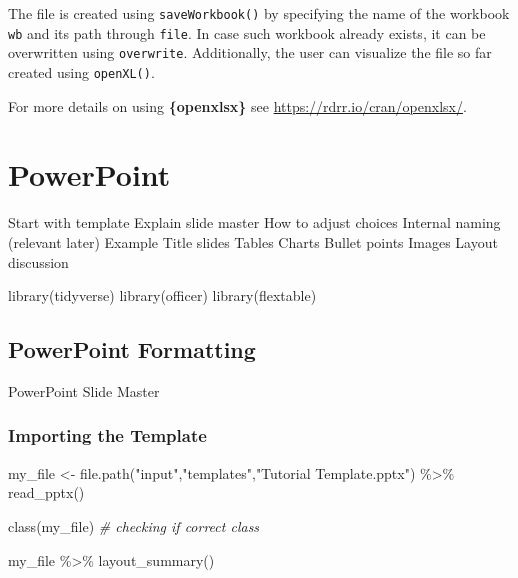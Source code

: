 \documentclass[
]{book}
\newenvironment{Shaded}{\begin{snugshade}}{\end{snugshade}}
\newcommand{\CommentTok}[1]{\textcolor[rgb]{0.56,0.35,0.01}{\textit{#1}}}
\newcommand{\FunctionTok}[1]{\textcolor[rgb]{0.00,0.00,0.00}{#1}}
\newcommand{\NormalTok}[1]{#1}
\newcommand{\OtherTok}[1]{\textcolor[rgb]{0.56,0.35,0.01}{#1}}
\newcommand{\SpecialCharTok}[1]{\textcolor[rgb]{0.00,0.00,0.00}{#1}}
\newcommand{\StringTok}[1]{\textcolor[rgb]{0.31,0.60,0.02}{#1}}
\begin{document}
The file is created using \texttt{saveWorkbook()} by specifying the name of the workbook \texttt{wb} and its path through \texttt{file}. In case such workbook already exists, it can be overwritten using \texttt{overwrite}. Additionally, the user can visualize the file so far created using \texttt{openXL()}.

For more details on using \textbf{\{openxlsx\}} see \url{https://rdrr.io/cran/openxlsx/}.

\hypertarget{powerpoint}{%
\section{PowerPoint}\label{powerpoint}}

Start with template
Explain slide master
How to adjust choices
Internal naming (relevant later)
Example
Title slides
Tables
Charts
Bullet points
Images
Layout discussion

\begin{Shaded}
\begin{Highlighting}[]
\FunctionTok{library}\NormalTok{(tidyverse)}
\FunctionTok{library}\NormalTok{(officer)}
\FunctionTok{library}\NormalTok{(flextable)}
\end{Highlighting}
\end{Shaded}

\hypertarget{powerpoint-formatting}{%
\subsection{PowerPoint Formatting}\label{powerpoint-formatting}}

PowerPoint Slide Master

\hypertarget{importing-the-template}{%
\subsubsection{Importing the Template}\label{importing-the-template}}

\begin{Shaded}
\begin{Highlighting}[]
\NormalTok{my\_file }\OtherTok{\textless{}{-}} \FunctionTok{file.path}\NormalTok{(}\StringTok{"input"}\NormalTok{,}\StringTok{"templates"}\NormalTok{,}\StringTok{"Tutorial Template.pptx"}\NormalTok{) }\SpecialCharTok{\%\textgreater{}\%} 
                        \FunctionTok{read\_pptx}\NormalTok{()}

\FunctionTok{class}\NormalTok{(my\_file) }\CommentTok{\# checking if correct class}

\NormalTok{my\_file }\SpecialCharTok{\%\textgreater{}\%}
  \FunctionTok{layout\_summary}\NormalTok{()}
\end{Highlighting}
\end{Shaded}
\end{document}
